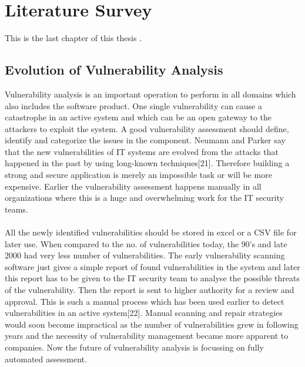 %
\section{Literature Survey}\label{sec:literature survey}
%
This is the last chapter of this thesis \cite{tur38}.
%
\subsection{Evolution of Vulnerability Analysis}
Vulnerability analysis is an important operation to perform in all domains which also includes the software product. One single vulnerability can cause a catastrophe in an active system and which can be an open gateway to the attackers to exploit the system. A good vulnerability assessment should define, identify and categorize the issues in the component. 
Neumann and Parker say that the new vulnerabilities of IT systems are evolved from the attacks that happened in the past by using long-known techniques[21]. Therefore building a strong and secure application is merely an impossible task or will be more expensive. Earlier the vulnerability assessment happens manually  in all organizations where this is a huge and overwhelming work for the IT security teams. 
\paragraph{}
All the newly identified vulnerabilities should be stored in excel or a CSV file for later use. When compared to the no. of vulnerabilities today, the 90’s and late 2000 had very less number of vulnerabilities. The early vulnerability scanning software just gives a simple report of found vulnerabilities in the system and later this report has to be given to the IT security team to analyse the possible threats of the vulnerability. Then the report is sent to higher authority for a review and approval. This is such a manual process which has been used earlier to detect vulnerabilities in an active system[22]. Manual scanning and repair strategies would soon become impractical as the number of vulnerabilities grew in following years and the necessity of vulnerability management became more apparent to companies. Now the future of vulnerability analysis is focussing on fully automated assessment.
